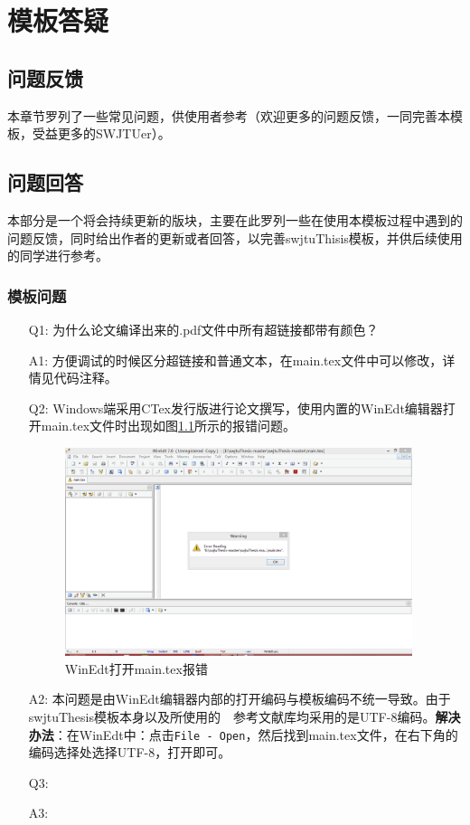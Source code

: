 \chapter{模板答疑}

\section{问题反馈}
\label{sec:contact}
本章节罗列了一些常见问题，供使用者参考（欢迎更多的问题反馈，一同完善本模板，受益更多的SWJTUer）。

\section{问题回答}
本部分是一个将会持续更新的版块，主要在此罗列一些在使用本模板过程中遇到的问题反馈，同时给出作者的更新或者回答，以完善swjtuThisis模板，并供后续使用的同学进行参考。

\subsection{模板问题}
\begin{enumerate}
	\item[Q1:]为什么论文编译出来的.pdf文件中所有超链接都带有颜色？
	\item[A1:]方便调试的时候区分超链接和普通文本，在main.tex文件中可以修改，详情见代码注释。
	\item[Q2:]Windows端采用CTex发行版进行论文撰写，使用内置的WinEdt编辑器打开main.tex文件时出现如图\ref{Q151208_1_Yang}所示的报错问题。
	\begin{figure}[htbp]
		\centering
		\includegraphics[width=4in]{figures/QA/Q151208_1_Yang.png}
		\caption{WinEdt打开main.tex报错}
		\label{Q151208_1_Yang}
	\end{figure}
	\item[A2:]本问题是由WinEdt编辑器内部的打开编码与模板编码不统一导致。由于swjtuThesis模板本身以及所使用的~\BibTeX{}~参考文献库均采用的是UTF-8编码。\textbf{解决办法}：在WinEdt中：点击\verb|File - Open|，然后找到main.tex文件，在右下角的编码选择处选择UTF-8，打开即可。
	\item[Q3:]
	\item[A3:]
\end{enumerate}

